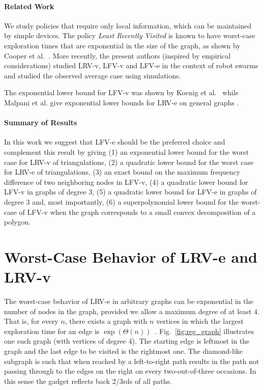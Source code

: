 \paragraph{Related Work}
\label{sec:RelatedWork} We study policies that require only local information, which can be
maintained by simple devices.  The policy {\em Least Recently Visited}
is known to have worst-case exploration times that are exponential
in the size of the graph, as shown by Cooper et al.~\cite{cik+-drwug-11}.
More recently, the present authors (inspired by empirical considerations) studied LRV-v, LFV-v
and LFV-e in the context of robot swarms and studied the observed average case
using simulations.

The exponential lower bound for LFV-v was shown by Koenig et al.~\cite{ksl+-ants-01}
while Malpani et al. give exponential lower bounds for LRV-e on general graphs \cite{mcvw+-distr-05}.

\paragraph{Summary of Results} In this work we suggest that LFV-e should be the preferred
choice and complement this result by giving (1) an exponential lower bound for the
worst case for LRV-v of triangulations, (2) a quadratic lower bound for
the worst case for LRV-e of triangulations, (3) an exact bound on the maximum frequency
difference of two neighboring nodes in LFV-v, (4) a quadratic lower bound for LFV-v
in graphs of degree 3, (5) a quadratic lower bound for LFV-e
in graphs of degree 3 and, most importantly, (6) a superpolynomial lower bound for the
worst-case of LFV-v when the graph corresponds to a small convex decomposition of a polygon.


\section{Worst-Case Behavior of LRV-e and LRV-v}
\label{sec:LRV}
The worst-case behavior of LRV-e in arbitrary graphs can be
exponential in the number of nodes in the graph, provided we allow a maximum
degree of at least 4. That is, for every $n$, there exists a graph with $n$
vertices in which the largest exploration time for an edge is
$\exp(\Theta(n))$~\cite{cik+-drwug-11}.  Fig.~\ref{fig:reg_graph} illustrates one
such graph (with vertices of degree 4). The starting edge is leftmost in the graph
and the last edge to be visited is the rightmost one. The diamond-like subgraph is
such that when reached by a left-to-right path results in the path
not passing through to the edges on the right on every two-out-of-three
occasions. In this sense the gadget reflects back 2/3rds of all paths.

